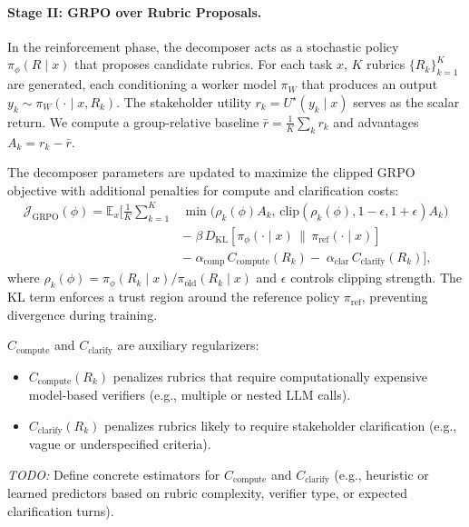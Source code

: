 \documentclass[sigconf]{acmart}
\begin{document}
\paragraph{Stage II: GRPO over Rubric Proposals.}
In the reinforcement phase, the decomposer acts as a stochastic policy 
$\pi_\phi(R\mid x)$ that proposes candidate rubrics.
For each task $x$, $K$ rubrics $\{R_k\}_{k=1}^K$ are generated,
each conditioning a worker model $\pi_W$ that produces 
an output $y_k \sim \pi_W(\cdot\mid x,R_k)$.
The stakeholder utility 
$r_k = U^\star(y_k\mid x)$ 
serves as the scalar return.
We compute a group-relative baseline 
$\bar{r} = \tfrac{1}{K}\sum_k r_k$
and advantages $A_k = r_k - \bar{r}$.

\smallskip
\noindent
The decomposer parameters are updated to maximize the clipped GRPO objective
with additional penalties for compute and clarification costs:
\begin{align}
\mathcal{J}_{\mathrm{GRPO}}(\phi)
=\mathbb{E}_x\Bigg[
\frac{1}{K}\sum_{k=1}^K
&\min\!\big(
\rho_k(\phi)A_k,\,
\mathrm{clip}(\rho_k(\phi),1-\epsilon,1+\epsilon)A_k
\big)
\nonumber\\
&-\;
\beta\,D_{\mathrm{KL}}\!\left[
\pi_\phi(\cdot\mid x)\,\|\,\pi_{\mathrm{ref}}(\cdot\mid x)
\right]
\nonumber\\
&-\;
\alpha_{\mathrm{comp}}\,C_{\mathrm{compute}}(R_k)
-\;
\alpha_{\mathrm{clar}}\,C_{\mathrm{clarify}}(R_k)
\Bigg],
\label{eq:lgrpo}
\end{align}
where $\rho_k(\phi)
=\pi_\phi(R_k\mid x)/\pi_{\mathrm{old}}(R_k\mid x)$
and $\epsilon$ controls clipping strength.
The KL term enforces a trust region around the reference policy $\pi_{\mathrm{ref}}$,
preventing divergence during training.

\smallskip
\noindent
$C_{\mathrm{compute}}$ and $C_{\mathrm{clarify}}$ are auxiliary regularizers:
\begin{itemize}
\item $C_{\mathrm{compute}}(R_k)$ penalizes rubrics that require
computationally expensive model-based verifiers (e.g., multiple or nested LLM calls).
\item $C_{\mathrm{clarify}}(R_k)$ penalizes rubrics likely to require 
stakeholder clarification (e.g., vague or underspecified criteria).
\end{itemize}

\noindent
\textit{TODO:} Define concrete estimators for
$C_{\mathrm{compute}}$ and $C_{\mathrm{clarify}}$ 
(e.g., heuristic or learned predictors based on rubric complexity, verifier type, or expected clarification turns).
\end{document}
